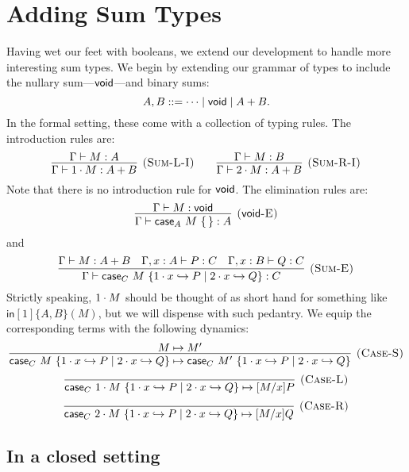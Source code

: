 \documentclass{article}
\begin{document}
\section{Adding Sum Types}

Having wet our feet with booleans, we extend our development to handle more interesting sum types.
We begin by extending our grammar of types to include the nullary sum---$\mathsf{void}$---and binary sums:
\[
  A, B ::= \dotsb \mid \mathsf{void} \mid A + B.
\]
In the formal setting, these come with a collection of typing rules.
The introduction rules are:
\[
  \infer[\rn{Sum-L-I}]{
    \hasEF{\Gamma}{\inl M}{A + B}
  }{
    \hasEF{\Gamma}{M}{A}
  }
  \qquad
  \infer[\rn{Sum-R-I}]{
    \hasEF{\Gamma}{\inr M}{A + B}
  }{
    \hasEF{\Gamma}{M}{B}
  }
\]
Note that there is no introduction rule for $\mathsf{void}$.
The elimination rules are:
\[
  \infer[\rn{\void-E}]{
    \hasEF{\Gamma}{\vcase{A}{M}}{A}
  }{
    \hasEF{\Gamma}{M}{\void}
  }
\]
and
\[
  \infer[\rn{Sum-E}]{
    \hasEF{\Gamma}{\scase{C}{M}{x}{P}{Q}}{C}
  }{
    \hasEF{\Gamma}{M}{A+B}
    &
    \hasEF{\Gamma,x:A}{P}{C}
    &
    \hasEF{\Gamma,x:B}{Q}{C}
  }
\]
Strictly speaking, $1\cdot M$ should be thought of as short hand for something like $\mathsf{in}[1]\{A,B\}(M)$, but we will dispense with such pedantry.
We equip the corresponding terms with the following dynamics:
\[
  \infer[\rn{Case-S}]{
    \step{\scase{C}{M}{x}{P}{Q}}{\scase{C}{M'}{x}{P}{Q}}
  }{
    \step{M}{M'}
  }
\]
\[
  \infer[\rn{Case-L}]{
    \step{\scase{C}{\inl M}{x}{P}{Q}}{\subst{M}{x}{P}}
  }{}
\]
\[
  \infer[\rn{Case-R}]{
    \step{\scase{C}{\inr M}{x}{P}{Q}}{\subst{M}{x}{Q}}
  }{}
\]

\subsection{In a closed setting}
\end{document}
